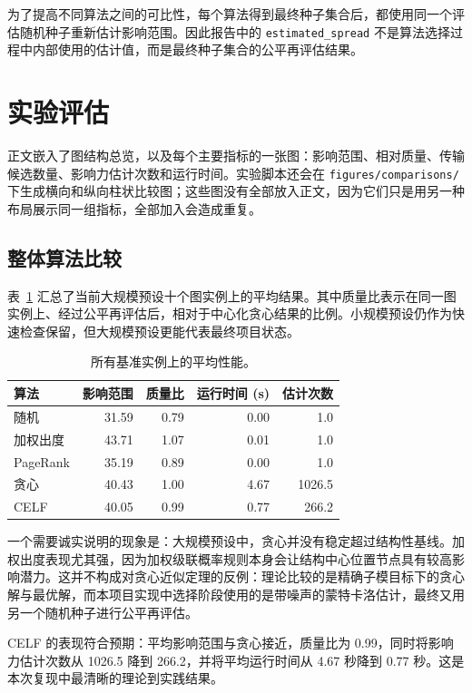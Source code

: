 \documentclass[UTF8, 11pt]{ctexart}
\begin{document}
为了提高不同算法之间的可比性，每个算法得到最终种子集合后，都使用同一个评估随机种子重新估计影响范围。因此报告中的 \texttt{estimated\_spread} 不是算法选择过程中内部使用的估计值，而是最终种子集合的公平再评估结果。

\section{实验评估}

正文嵌入了图结构总览，以及每个主要指标的一张图：影响范围、相对质量、传输候选数量、影响力估计次数和运行时间。实验脚本还会在 \texttt{figures/comparisons/} 下生成横向和纵向柱状比较图；这些图没有全部放入正文，因为它们只是用另一种布局展示同一组指标，全部加入会造成重复。

\subsection{整体算法比较}

表~\ref{tab:overall} 汇总了当前大规模预设十个图实例上的平均结果。其中质量比表示在同一图实例上、经过公平再评估后，相对于中心化贪心结果的比例。小规模预设仍作为快速检查保留，但大规模预设更能代表最终项目状态。

\begin{table}[H]
\centering
\caption{所有基准实例上的平均性能。}
\label{tab:overall}
\begin{tabular}{lrrrr}
\toprule
算法 & 影响范围 & 质量比 & 运行时间 (s) & 估计次数 \\
\midrule
随机 & 31.59 & 0.79 & 0.00 & 1.0 \\
加权出度 & 43.71 & 1.07 & 0.01 & 1.0 \\
PageRank & 35.19 & 0.89 & 0.00 & 1.0 \\
贪心 & 40.43 & 1.00 & 4.67 & 1026.5 \\
CELF & 40.05 & 0.99 & 0.77 & 266.2 \\
\bottomrule
\end{tabular}
\end{table}

一个需要诚实说明的现象是：大规模预设中，贪心并没有稳定超过结构性基线。加权出度表现尤其强，因为加权级联概率规则本身会让结构中心位置节点具有较高影响潜力。这并不构成对贪心近似定理的反例：理论比较的是精确子模目标下的贪心解与最优解，而本项目实现中选择阶段使用的是带噪声的蒙特卡洛估计，最终又用另一个随机种子进行公平再评估。

CELF 的表现符合预期：平均影响范围与贪心接近，质量比为 0.99，同时将影响力估计次数从 1026.5 降到 266.2，并将平均运行时间从 4.67 秒降到 0.77 秒。这是本次复现中最清晰的理论到实践结果。
\end{document}
